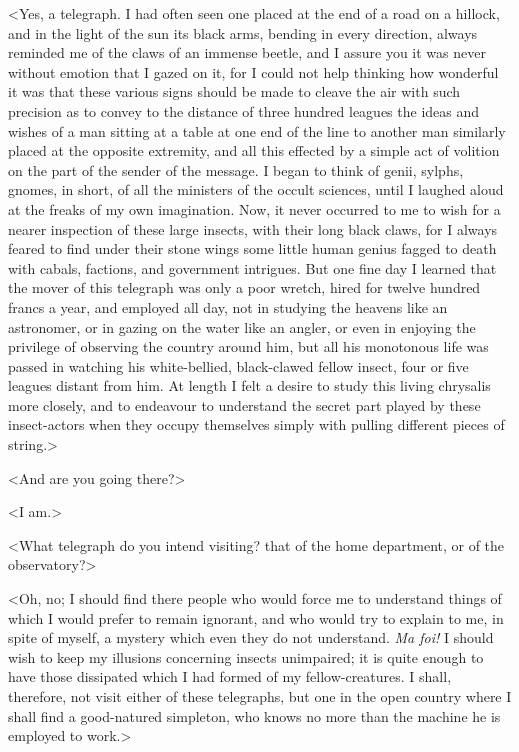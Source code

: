  <Yes, a telegraph. I had often seen one placed at the end of a road on a hillock, and in the light of the sun its black arms, bending in every direction, always reminded me of the claws of an immense beetle, and I assure you it was never without emotion that I gazed on it, for I could not help thinking how wonderful it was that these various signs should be made to cleave the air with such precision as to convey to the distance of three hundred leagues the ideas and wishes of a man sitting at a table at one end of the line to another man similarly placed at the opposite extremity, and all this effected by a simple act of volition on the part of the sender of the message. I began to think of genii, sylphs, gnomes, in short, of all the ministers of the occult sciences, until I laughed aloud at the freaks of my own imagination. Now, it never occurred to me to wish for a nearer inspection of these large insects, with their long black claws, for I always feared to find under their stone wings some little human genius fagged to death with cabals, factions, and government intrigues. But one fine day I learned that the mover of this telegraph was only a poor wretch, hired for twelve hundred francs a year, and employed all day, not in studying the heavens like an astronomer, or in gazing on the water like an angler, or even in enjoying the privilege of observing the country around him, but all his monotonous life was passed in watching his white-bellied, black-clawed fellow insect, four or five leagues distant from him. At length I felt a desire to study this living chrysalis more closely, and to endeavour to understand the secret part played by these insect-actors when they occupy themselves simply with pulling different pieces of string.>

<And are you going there?> 

 <I am.> 

 <What telegraph do you intend visiting? that of the home department, or of the observatory?> 

 <Oh, no; I should find there people who would force me to understand things of which I would prefer to remain ignorant, and who would try to explain to me, in spite of myself, a mystery which even they do not understand. \textit{Ma foi!} I should wish to keep my illusions concerning insects unimpaired; it is quite enough to have those dissipated which I had formed of my fellow-creatures. I shall, therefore, not visit either of these telegraphs, but one in the open country where I shall find a good-natured simpleton, who knows no more than the machine he is employed to work.> 

